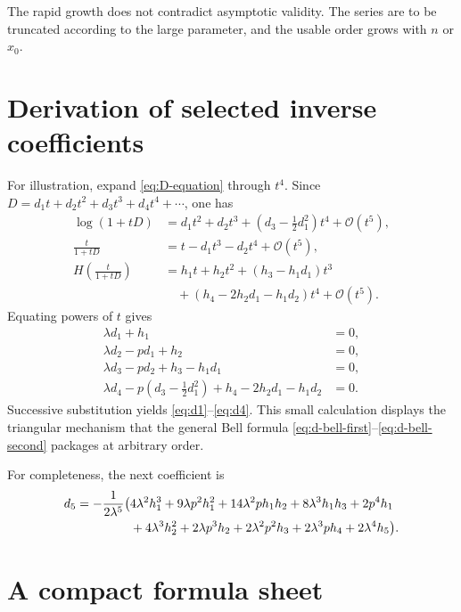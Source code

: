 \documentclass[11pt,oneside]{article}
\numberwithin{equation}{section}
\theoremstyle{plain}
\theoremstyle{definition}
\theoremstyle{remark}
\newcommand{\Ord}{\mathcal O}
\begin{document}
The rapid growth does not contradict asymptotic validity.  The series are to
be truncated according to the large parameter, and the usable order grows
with $n$ or $x_0$.

\section{Derivation of selected inverse coefficients}\label{app:d-derivations}

For illustration, expand \eqref{eq:D-equation} through $t^4$.  Since
$D=d_1t+d_2t^2+d_3t^3+d_4t^4+\cdots$, one has
\begin{align*}
 \log(1+tD)
 &=d_1t^2+d_2t^3+
   \left(d_3-\frac12d_1^2\right)t^4+\Ord(t^5),\\
 \frac{t}{1+tD}
 &=t-d_1t^3-d_2t^4+\Ord(t^5),\\
 H\!\left(\frac{t}{1+tD}\right)
 &=h_1t+h_2t^2+(h_3-h_1d_1)t^3\\
 &\quad +(h_4-2h_2d_1-h_1d_2)t^4+\Ord(t^5).
\end{align*}
Equating powers of $t$ gives
\begin{align*}
 \lambda d_1+h_1&=0,\\
 \lambda d_2-pd_1+h_2&=0,\\
 \lambda d_3-pd_2+h_3-h_1d_1&=0,\\
 \lambda d_4-p\left(d_3-\frac12d_1^2\right)
 +h_4-2h_2d_1-h_1d_2&=0.
\end{align*}
Successive substitution yields \eqref{eq:d1}--\eqref{eq:d4}.  This small
calculation displays the triangular mechanism that the general Bell formula
\eqref{eq:d-bell-first}--\eqref{eq:d-bell-second} packages at arbitrary
order.

For completeness, the next coefficient is
\begin{align}
 d_5=-\frac1{2\lambda^5}\bigl(&4\lambda^2h_1^3
 +9\lambda p^2h_1^2+14\lambda^2p h_1h_2
 +8\lambda^3h_1h_3+2p^4h_1\notag\\
 &+4\lambda^3h_2^2+2\lambda p^3h_2
 +2\lambda^2p^2h_3+2\lambda^3p h_4
 +2\lambda^4h_5\bigr).
\label{eq:d5}
\end{align}

\section{A compact formula sheet}\label{app:formula-sheet}
\end{document}
